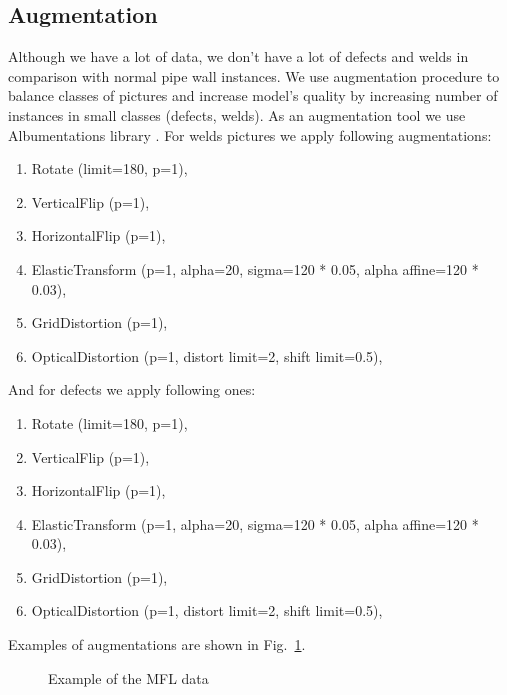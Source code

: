 \subsection{Augmentation}
Although we have a lot of data, we don't have a lot of defects and welds in comparison with normal pipe wall instances.
We use augmentation procedure to balance classes of pictures and increase model's quality by increasing number of instances in small classes (defects, welds).
As an augmentation tool we use Albumentations library \cite{buslaev2020albumentations}.
For welds pictures we apply following augmentations:
\begin{enumerate}
	\item Rotate (limit=180, p=1),
	\item VerticalFlip (p=1), 
	\item HorizontalFlip (p=1), 
	\item ElasticTransform (p=1, alpha=20, sigma=120 * 0.05, alpha affine=120 * 0.03), 
	\item GridDistortion (p=1),
	\item OpticalDistortion (p=1, distort limit=2, shift limit=0.5),
\end{enumerate}

And for defects we apply following ones:
\begin{enumerate}
	\item Rotate (limit=180, p=1),
	\item VerticalFlip (p=1), 
	\item HorizontalFlip (p=1), 
	\item ElasticTransform (p=1, alpha=20, sigma=120 * 0.05, alpha affine=120 * 0.03), 
	\item GridDistortion (p=1),
	\item OpticalDistortion (p=1, distort limit=2, shift limit=0.5),
\end{enumerate}
Examples of augmentations are shown in Fig.~\ref{ris:aug_example}.
\begin{figure}[ht]
	\caption{Example of the MFL data}
	\label{ris:aug_example}
\end{figure}


